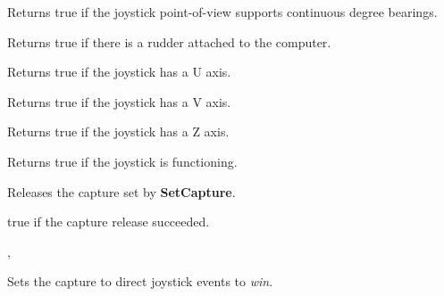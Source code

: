 Returns true if the joystick point-of-view supports continuous degree bearings.

\label{wxjoystickhasrudder}


Returns true if there is a rudder attached to the computer.

\label{wxjoystickhasu}


Returns true if the joystick has a U axis.

\label{wxjoystickhasv}


Returns true if the joystick has a V axis.

\label{wxjoystickhasz}


Returns true if the joystick has a Z axis.

\label{wxjoystickisok}


Returns true if the joystick is functioning.

\label{wxjoystickreleasecapture}


Releases the capture set by {\bf SetCapture}.


true if the capture release succeeded.


, 

\label{wxjoysticksetcapture}


Sets the capture to direct joystick events to {\it win}.




